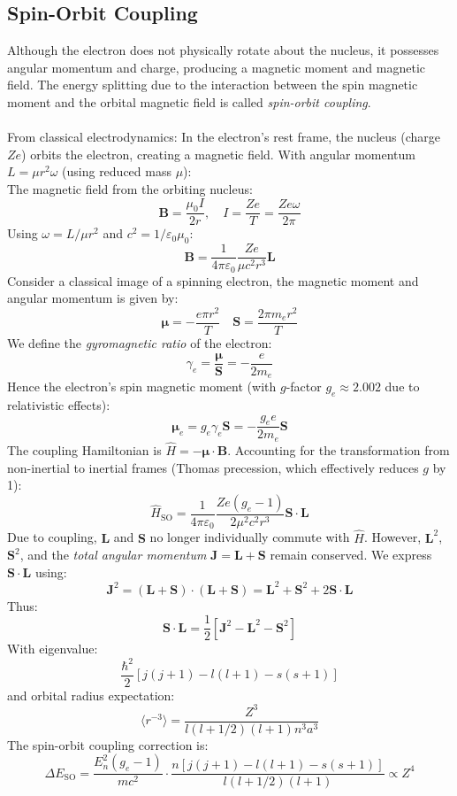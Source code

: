 \subsection{Spin-Orbit Coupling}\label{soc}

Although the electron does not physically rotate about the nucleus, it possesses angular momentum and charge, producing a magnetic moment and magnetic field. The energy splitting due to the interaction between the spin magnetic moment and the orbital magnetic field is called \emph{spin-orbit coupling}.\\ \\
From classical electrodynamics: In the electron's rest frame, the nucleus (charge $Ze$) orbits the electron, creating a magnetic field. With angular momentum $L = \mu r^2\omega$ (using reduced mass $\mu$):\\
The magnetic field from the orbiting nucleus:
\[
\mathbf{B} = \frac{\mu_0 I}{2r}, \quad I = \frac{Ze}{T} = \frac{Ze\omega}{2\pi}
\]
Using $\omega = L/\mu r^2$ and $c^2 = 1/\varepsilon_0\mu_0$:
\[
\mathbf{B} = \frac{1}{4\pi\varepsilon_0}\frac{Ze}{\mu c^2 r^3}\mathbf{L}
\]
Consider a classical image of a spinning electron, the magnetic moment and angular momentum is given by:
\[
\mathbf{\mu} = -\frac{e\pi r^2}{T}
\quad
\mathbf{S} = \frac{2\pi m_er^2}{T}
\]
We define the \emph{gyromagnetic ratio} of the electron:\label{gyro}
\[\gamma_e = \frac{\mathbf{\mu}}{\mathbf{S}} = -\frac{e}{2m_e}\]
Hence the electron's spin magnetic moment (with $g$-factor $g_e \approx 2.002$ due to relativistic effects):
\[
\mathbf{\mu}_e = g_e \gamma_e \mathbf{S} = -\frac{g_e e}{2m_e}\mathbf{S}
\]
The coupling Hamiltonian is $\hat{H} = -\mathbf{\mu}\cdot\mathbf{B}$. Accounting for the transformation from non-inertial to inertial frames (Thomas precession, which effectively reduces $g$ by 1):
\[
\hat{H}_{\text{SO}} = \frac{1}{4\pi\varepsilon_0}\frac{Ze(g_e-1)}{2\mu^2 c^2 r^3}\mathbf{S}\cdot\mathbf{L}
\]
Due to coupling, $\mathbf{L}$ and $\mathbf{S}$ no longer individually commute with $\hat{H}$. However, $\mathbf{L}^2$, $\mathbf{S}^2$, and the \emph{total angular momentum} $\mathbf{J} = \mathbf{L} + \mathbf{S}$ remain conserved. We express $\mathbf{S}\cdot\mathbf{L}$ using:
\[
\mathbf{J}^2 = (\mathbf{L}+\mathbf{S})\cdot(\mathbf{L}+\mathbf{S}) = \mathbf{L}^2 + \mathbf{S}^2 + 2\mathbf{S}\cdot\mathbf{L}
\]
Thus:
\[
\mathbf{S}\cdot\mathbf{L} = \frac{1}{2}\left[\mathbf{J}^2 - \mathbf{L}^2 - \mathbf{S}^2\right]
\]
With eigenvalue:
\[\frac{\hbar^2}{2}[j(j+1) - l(l+1) - s(s+1)]\]
and orbital radius expectation:
\[
\langle r^{-3}\rangle = \frac{Z^3}{l(l+1/2)(l+1)n^3 a^3}
\]
The spin-orbit coupling correction is:
\[
\Delta E_{\text{SO}} = \frac{E_n^2 (g_e-1)}{mc^2} \cdot \frac{n[j(j+1) - l(l+1) - s(s+1)]}{l(l+1/2)(l+1)} \propto Z^4
\]

